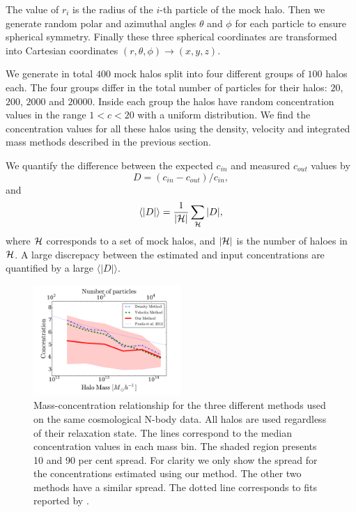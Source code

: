 \documentclass[a4,useAMS,usenatbib,usegraphicx]{mn2e}
\newcommand{\avg}[1]{\langle{#1}\rangle}
\begin{document}
The value of $r_i$ is the radius of the $i$-th particle of the mock
halo.  
Then we generate random polar and azimuthal angles $\theta$ and
$\phi$ for each particle to ensure spherical symmetry.  
Finally these three spherical coordinates are transformed into
Cartesian coordinates $(r,\theta,\phi) \rightarrow (x,y,z)$.

We generate in total $400$ mock halos split into four different groups
of $100$ halos each.  
The four groups differ in the total number of particles for their
halos: $20$, $200$, $2000$ and $20000$.   
Inside each group the halos have random concentration values in the range
$1<c<20$ with a uniform distribution.  
We find the concentration values for all these halos using the
density, velocity and integrated mass methods described in the
previous section.    

We quantify the difference between the expected $c_{in}$ and measured
$c_{out}$ values by 
%
\begin{equation}
D=(c_{in}-c_{out})/c_{in},
\label{eq:D}
\end{equation}
%
and
%
\begin{equation}
\avg{|D|}=\frac{1}{\left|{\cal{H}}\right|}\sum_{{\cal{H}}} |D|,
\end{equation}
%
where ${\cal{H}}$ corresponds to a set of mock halos, and
$\left|{\cal{H}}\right|$ is the number of haloes in ${\cal{H}}$. 
A large discrepacy between the estimated and input concentrations are
quantified by a large $\avg{|D|}$.

\begin{figure}
\begin{center}
  \includegraphics[width=0.50\textwidth]{concentration.pdf}
\end{center}
\caption{Mass-concentration relationship for the three different
  methods used on the same cosmological N-body data. 
  All halos are used regardless of their relaxation state.
  The lines correspond to the median concentration values in each mass bin.
  The shaded region presents 10 and 90 per cent spread.
  For clarity we only show the spread for the concentrations estimated
  using our method. The other two methods have a similar spread. The
  dotted line corresponds to fits reported by \citep{Prada2012}.
  \label{fig:concentration}}
\end{figure}
\end{document}

